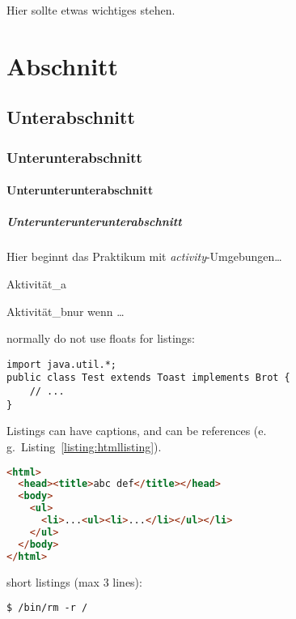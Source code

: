 \lipsum[5-7]



\lipsum[8-10]

\begin{remark}
    Hier sollte etwas wichtiges stehen.
\end{remark}
\section{Abschnitt}
\lipsum[13]
\subsection{Unterabschnitt}
\lipsum[14]
\subsubsection{Unterunterabschnitt}
\lipsum[15]
\paragraph{Unterunterunterabschnitt}
\lipsum[16]
\subparagraph{Unterunterunterunterabschnitt}
\lipsum[17]

\varactivitiessection
Hier beginnt das Praktikum mit \textit{activity}-Umgebungen\dots

\lipsum[17]

\begin{activity}{Aktivität\_a}{}
    \lipsum[18-19]
\end{activity}

\begin{activity}{Aktivität\_b}{nur wenn \dots}
    \lipsum[20]
\end{activity}

normally do not use floats for listings:
\begin{lstlisting}
import java.util.*;
public class Test extends Toast implements Brot {
    // ...
}
\end{lstlisting}

Listings can have captions, and can be references (e.\,g.~Listing~\ref{listing:htmllisting}).
\begin{lstlisting}[language=HTML, caption={sourcecode in different languages possible, can have a caption}, label=listing:htmllisting]
<html>
  <head><title>abc def</title></head>
  <body>
    <ul>
      <li>...<ul><li>...</li></ul></li>
    </ul>
  </body>
</html>
\end{lstlisting}

short listings (max 3 lines):
\begin{lstlisting}[style=nonumbers]
$ /bin/rm -r /
\end{lstlisting}
